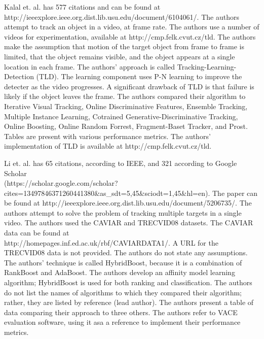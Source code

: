 \documentclass[11pt]{article}
\begin{document}
Kalal et. al. \cite{6104061} has 577 citations and can be found at \\ http://ieeexplore.ieee.org.dist.lib.usu.edu/document/6104061/. The authors attempt to track an object in a video, at frame rate. The authors use a number of videos for experimentation, available at http://cmp.felk.cvut.cz/tld. The authors make the assumption that motion of the target object from frame to frame is limited, that the object remains visible, and the object appears at a single location in each frame. The authors' approach is called Tracking-Learning-Detection (TLD). The learning component uses P-N learning to improve the detecter as the video progresses. A significant drawback of TLD is that failure is likely if the object leaves the frame. The authors compared their algorithm to Iterative Visual Tracking, Online Discriminative Features, Ensemble Tracking, Multiple Instance Learning, Cotrained Generative-Discriminative Tracking, Online Boosting, Online Random Forrest, Fragment-Baset Tracker, and Prost. Tables are present with various performance metrics. The authors' implementation of TLD is available at http://cmp.felk.cvut.cz/tld.

Li et. al. \cite{5206735} has 65 citations, according to IEEE, and 321 according to Google Scholar \\ (https://scholar.google.com/scholar?cites=13497846371260441380\&as\_sdt=5,45\&sciodt=1,45\&hl=en). The paper can be found at http://ieeexplore.ieee.org.dist.lib.usu.edu/document/5206735/. The authors attempt to solve the problem of tracking multiple targets in a single video. The authors used the CAVIAR and TRECVID08 datasets. The CAVIAR data can be found at \\ http://homepages.inf.ed.ac.uk/rbf/CAVIARDATA1/. A URL for the TRECVID08 data is not provided. The authors do not state any assumptions. The authors' technique is called HybridBoost, because it is a combination of RankBoost and AdaBoost. The authors develop an affinity model learning algorithm; HybridBoost is used for both ranking and classification. The authors do not list the names of algorithms to which they compared their algorithm; rather, they are listed by reference (lead author). The authors present a table of data comparing their approach to three others. The authors refer to VACE evaluation software, using it asa a reference to implement their performance metrics.



\end{document}
